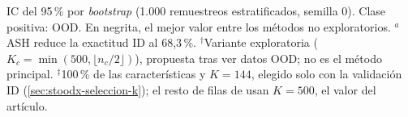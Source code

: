 \begin{table}
\smallskip
\parbox{\linewidth}{\scriptsize IC del 95\,\% por \emph{bootstrap} (1.000 remuestreos estratificados, semilla 0). Clase positiva: OOD. En negrita, el mejor valor entre los métodos no exploratorios. $^{a}$ASH reduce la exactitud ID al 68{,}3\,\%. $^{\dagger}$Variante exploratoria ($K_c=\min(500,\lfloor n_c/2\rfloor)$), propuesta tras ver datos OOD; no es el método principal. $^{\ddagger}$100\,\% de las características y $K=144$, elegido solo con la validación ID (\cref{sec:stoodx-seleccion-k}); el resto de filas de \stoodx usan $K=500$, el valor del artículo.}
\end{table}
